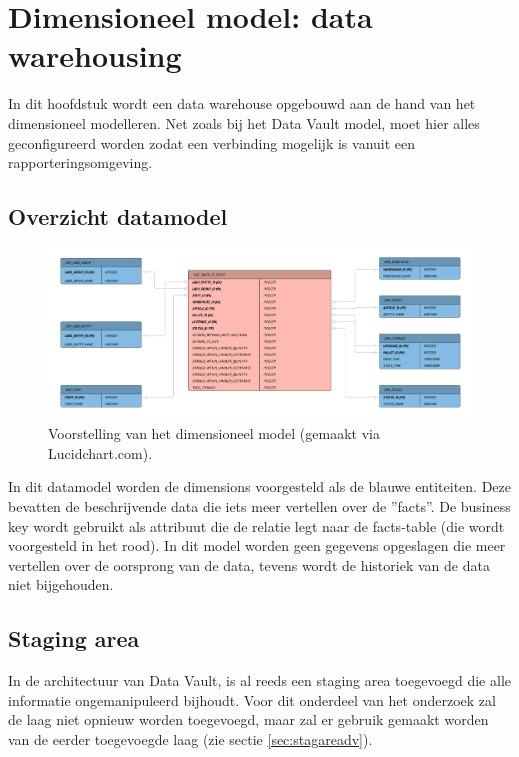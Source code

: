
\chapter{Dimensioneel model: data warehousing}
\label{ch:dimmodel}
In dit hoofdstuk wordt een data warehouse opgebouwd aan de hand van het dimensioneel modelleren. Net zoals bij het Data Vault model, moet hier alles geconfigureerd worden zodat een verbinding mogelijk is vanuit een rapporteringsomgeving.

\section{Overzicht datamodel}
\begin{figure}[h]
	\centering
	\includegraphics[scale=0.5]{../images/Dimensioneelmodel.png}
	\caption{Voorstelling van het dimensioneel model (gemaakt via Lucidchart.com).}
	\label{fig:dmdm}
\end{figure}

In dit datamodel worden de dimensions voorgesteld als de blauwe entiteiten. Deze bevatten de beschrijvende data die iets meer vertellen over de ''facts''. De business key wordt gebruikt als attribuut die de relatie legt naar de facts-table (die wordt voorgesteld in het rood). In dit model worden geen gegevens opgeslagen die meer vertellen over de oorsprong van de data, tevens wordt de historiek van de data niet bijgehouden.

\section{Staging area}
In de architectuur van Data Vault, is al reeds een staging area toegevoegd die alle informatie ongemanipuleerd bijhoudt. Voor dit onderdeel van het onderzoek zal de laag niet opnieuw worden toegevoegd, maar zal er gebruik gemaakt worden van de eerder toegevoegde laag (zie sectie \ref{sec:stagareadv}).


